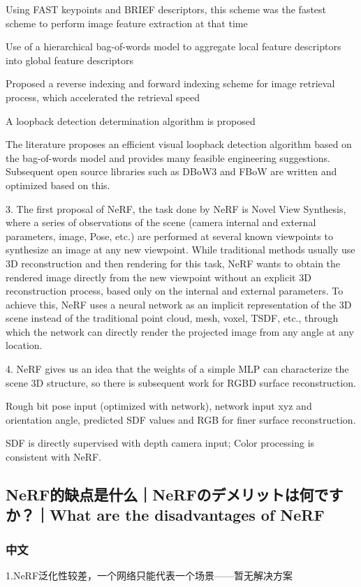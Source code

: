 \documentclass[lang=cn,11pt,a4paper]{elegantpaper}
\begin{document}
Using FAST keypoints and BRIEF descriptors, this scheme was the fastest scheme to perform image feature extraction at that time

Use of a hierarchical bag-of-words model to aggregate local feature descriptors into global feature descriptors

Proposed a reverse indexing and forward indexing scheme for image retrieval process, which accelerated the retrieval speed

A loopback detection determination algorithm is proposed 

The literature proposes an efficient visual loopback detection algorithm based on the bag-of-words model and provides many feasible engineering suggestions. Subsequent open source libraries such as DBoW3 and FBoW are written and optimized based on this. 

3. The first proposal of NeRF, the task done by NeRF is Novel View Synthesis, where a series of observations of the scene (camera internal and external parameters, image, Pose, etc.) are performed at several known viewpoints to synthesize an image at any new viewpoint. While traditional methods usually use 3D reconstruction and then rendering for this task, NeRF wants to obtain the rendered image directly from the new viewpoint without an explicit 3D reconstruction process, based only on the internal and external parameters. To achieve this, NeRF uses a neural network as an implicit representation of the 3D scene instead of the traditional point cloud, mesh, voxel, TSDF, etc., through which the network can directly render the projected image from any angle at any location.

4. NeRF gives us an idea that the weights of a simple MLP can characterize the scene 3D structure, so there is subsequent work for RGBD surface reconstruction.

Rough bit pose input (optimized with network), network input xyz and orientation angle, predicted SDF values and RGB for finer surface reconstruction.

SDF is directly supervised with depth camera input; Color processing is consistent with NeRF.


\subsection{NeRF的缺点是什么｜NeRFのデメリットは何ですか？｜What are the disadvantages of NeRF}
\subsubsection{中文}
1.NeRF泛化性较差，一个网络只能代表一个场景——暂无解决方案
\end{document}
